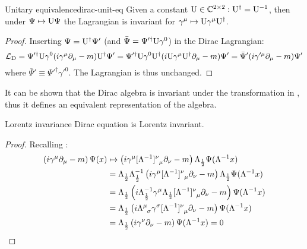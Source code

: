 \begin{proposition}{Unitary equivalence}{dirac-unit-eq}
  Given a constant $ \mathrm{U} \in \mathbb{C}^{2 \times 2} : \mathrm{U}^\dagger = \mathrm{U}^{-1} $, then under $ \Psi \mapsto \mathrm{U} \Psi $ the Lagrangian is invariant for $ \gamma^\mu \mapsto \mathrm{U} \gamma^\mu \mathrm{U}^\dagger $.
\end{proposition}

\begin{proofbox}
  \begin{proof}
    Inserting $ \Psi = \mathrm{U}^\dagger \Psi' $ (and $ \bar{\Psi} = \Psi'^\dagger \mathrm{U} \gamma^0 $) in the Dirac Lagrangian:
    \begin{equation*}
      \mathcal{L}_\text{D} = \Psi'^\dagger \mathrm{U} \gamma^0 (i \gamma^\mu \partial_\mu - m) \mathrm{U}^\dagger \Psi' = \Psi'^\dagger \mathrm{U} \gamma^0 \mathrm{U}^\dagger (i \mathrm{U} \gamma^\mu \mathrm{U}^\dagger \partial_\mu - m) \Psi' = \bar{\Psi}' (i \gamma'^\mu \partial_\mu - m) \Psi'
    \end{equation*}
    where $ \bar{\Psi}' \equiv \Psi'^\dagger \gamma'^0 $. The Lagrangian is thus unchanged.
  \end{proof}
\end{proofbox}

It can be shown that the Dirac algebra is invariant under the transformation in , thus it defines an equivalent representation of the algebra.

\begin{proposition}{Lorentz invariance}{}
  Dirac equation is Lorentz invariant.
\end{proposition}

\begin{proofbox}
  \begin{proof}
    Recalling :
    \begin{equation*}
      \begin{split}
        \left( i \gamma^\mu \pa_\mu - m \right) \Psi(x)
        &\mapsto \left( i \gamma^\mu \tensor{[\Lambda^{-1}]}{^\nu_\mu} \pa_\nu - m \right) \Lambda_{\frac{1}{2}} \Psi(\Lambda^{-1}x) \\
        &= \Lambda_{\frac{1}{2}} \Lambda_{\frac{1}{2}}^{-1} \left( i \gamma^\mu \tensor{[\Lambda^{-1}]}{^\nu_\mu} \pa_\nu - m \right) \Lambda_{\frac{1}{2}} \Psi(\Lambda^{-1}x) \\
        &= \Lambda_{\frac{1}{2}} \left( i \Lambda_{\frac{1}{2}}^{-1} \gamma^\mu \Lambda_{\frac{1}{2}} \tensor{[\Lambda^{-1}]}{^\nu_\mu} \pa_\nu - m \right) \Psi(\Lambda^{-1}x) \\
        &= \Lambda_{\frac{1}{2}} \left( i \tensor{\Lambda}{^\mu_\sigma} \gamma^\sigma \tensor{[\Lambda^{-1}]}{^\nu_\mu} \pa_\nu - m \right) \Psi(\Lambda^{-1}x) \\
        &= \Lambda_{\frac{1}{2}} \left( i \gamma^\nu \pa_\nu - m \right) \Psi(\Lambda^{-1}x) = 0
      \end{split}
    \end{equation*}
  \end{proof}
\end{proofbox}

